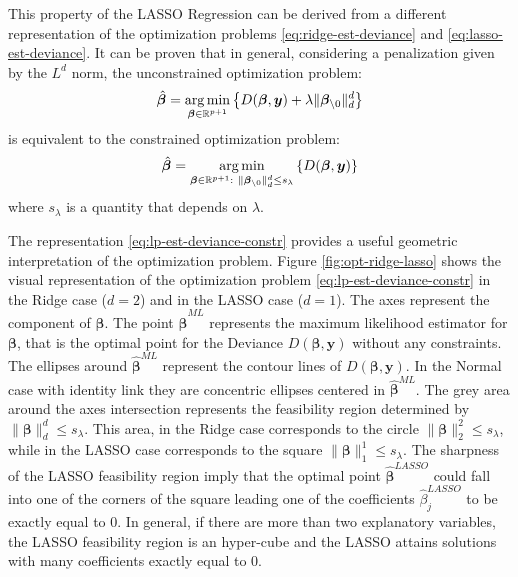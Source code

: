 \documentclass[a4paper, nobind]{templates/ociamthesis}
\theoremstyle{definition}
\theoremstyle{definition}
\theoremstyle{definition}
\theoremstyle{remark}
\begin{document}
This property of the LASSO Regression can be derived from a different representation of the optimization problems \eqref{eq:ridge-est-deviance} and \eqref{eq:lasso-est-deviance}. It can be proven that in general, considering a penalization given by the \(L^d\) norm, the unconstrained optimization problem:
\begin{equation}
\label{eq:ld-est-deviance}
\hat{\boldsymbol{\beta}} = \operatorname*{arg\,min}_{\boldsymbol{\beta}\in\mathbb{R}^{p+1}}{\left\{D(\boldsymbol{\beta}, \boldsymbol{y}) + \lambda \|\boldsymbol{\beta}_{\setminus0}\|_d^d\right\}}
\end{equation}
is equivalent to the constrained optimization problem:
\begin{equation}
\label{eq:lp-est-deviance-constr}
\hat{\boldsymbol{\beta}} = \operatorname*{arg\,min}_{\boldsymbol{\beta}\in\mathbb{R}^{p+1}:\  \|\boldsymbol{\beta}_{\setminus0}\|_d^d \le s_{\lambda}}{ \left\{ D(\boldsymbol{\beta}, \boldsymbol{y}) \right\} }
\end{equation}
where \(s_{\lambda}\) is a quantity that depends on \(\lambda\).

The representation \eqref{eq:lp-est-deviance-constr} provides a useful geometric interpretation of the optimization problem. Figure \ref{fig:opt-ridge-lasso} shows the visual representation of the optimization problem \eqref{eq:lp-est-deviance-constr} in the Ridge case (\(d=2\)) and in the LASSO case (\(d=1\)). The axes represent the component of \(\boldsymbol{\beta}\). The point \(\hat{\boldsymbol{\beta}}^{ML}\) represents the maximum likelihood estimator for \(\boldsymbol{\beta}\), that is the optimal point for the Deviance \(D(\boldsymbol{\beta}, \boldsymbol{y})\) without any constraints. The ellipses around \(\hat{\boldsymbol{\beta}}^{ML}\) represent the contour lines of \(D(\boldsymbol{\beta}, \boldsymbol{y})\). In the Normal case with identity link they are concentric ellipses centered in \(\hat{\boldsymbol{\beta}}^{ML}\). The grey area around the axes intersection represents the feasibility region determined by \(\|\boldsymbol{\beta}\|_d^d \le s_\lambda\). This area, in the Ridge case corresponds to the circle \(\|\boldsymbol{\beta}\|_2^2 \le s_\lambda\), while in the LASSO case corresponds to the square \(\|\boldsymbol{\beta}\|_1^1 \le s_\lambda\). The sharpness of the LASSO feasibility region imply that the optimal point \(\hat{\boldsymbol{\beta}}^{LASSO}\) could fall into one of the corners of the square leading one of the coefficients \(\hat{\beta}_j^{LASSO}\) to be exactly equal to \(0\). In general, if there are more than two explanatory variables, the LASSO feasibility region is an hyper-cube and the LASSO attains solutions with many coefficients exactly equal to \(0\).
\end{document}
